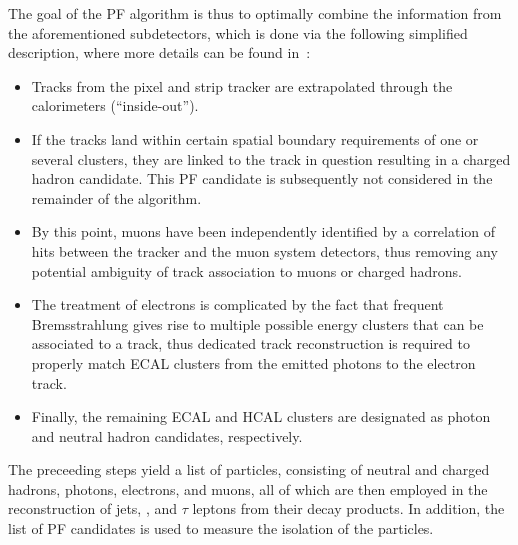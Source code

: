 The goal of the PF algorithm is thus to optimally combine the information from the aforementioned subdetectors, which is done via the following simplified description, where more details can be found in~\cite{Sirunyan:2017ulk}:
\begin{itemize}
  \item Tracks from the pixel and strip tracker are extrapolated through the calorimeters (``inside-out'').
  \item If the tracks land within certain spatial boundary requirements of one or several clusters, they are linked to the track in question resulting in a charged hadron candidate. This PF candidate is subsequently not considered in the remainder of the algorithm.
  \item By this point, muons have been independently identified by a correlation of hits between the tracker and the muon system detectors, thus removing any potential ambiguity of track association to muons or charged hadrons.
  \item The treatment of electrons is complicated by the fact that frequent Bremsstrahlung gives rise to multiple possible energy clusters that can be associated to a track, thus dedicated track reconstruction is required to properly match ECAL clusters from the emitted photons to the electron track. 
  \item Finally, the remaining ECAL and HCAL clusters are designated as photon and neutral hadron candidates, respectively.
\end{itemize}

The preceeding steps yield a list of particles, consisting of neutral and charged hadrons, photons, electrons, and muons, all of which are then employed in the reconstruction of jets, \MET, and $\tau$ leptons from their decay products. In addition, the list of PF candidates is used to measure the isolation of the particles.

